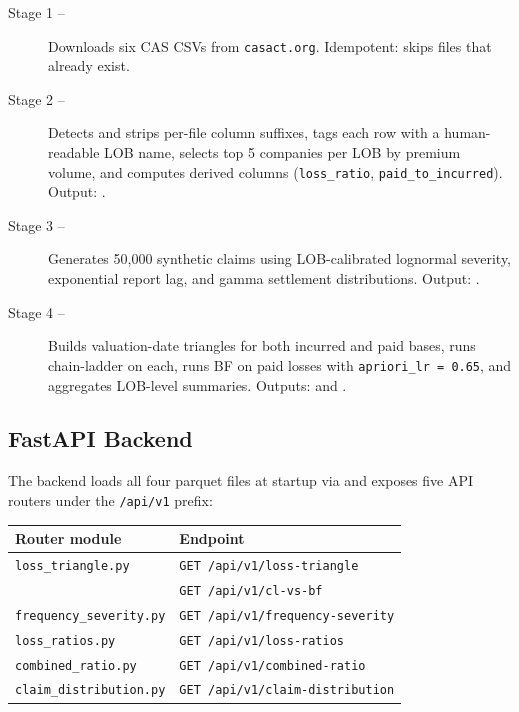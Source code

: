 \begin{description}
  \item[Stage 1 -- ]
    Downloads six CAS CSVs from \texttt{casact.org}.  Idempotent: skips files
    that already exist.

  \item[Stage 2 -- ]
    Detects and strips per-file column suffixes, tags each row with a
    human-readable LOB name, selects top 5 companies per LOB by premium volume,
    and computes derived columns (\texttt{loss\_ratio},
    \texttt{paid\_to\_incurred}).
    Output: .

  \item[Stage 3 -- ]
    Generates 50,000 synthetic claims using LOB-calibrated lognormal severity,
    exponential report lag, and gamma settlement distributions.
    Output: .

  \item[Stage 4 -- ]
    Builds valuation-date triangles for both incurred and paid bases, runs
    chain-ladder on each, runs BF on paid losses with \texttt{apriori\_lr = 0.65},
    and aggregates LOB-level summaries.
    Outputs:  and
    .
\end{description}

\subsection{FastAPI Backend}

The backend loads all four parquet files at startup via
 and exposes five API
routers under the \texttt{/api/v1} prefix:

\begin{center}
\begin{tabular}{ll}
\toprule
\textbf{Router module} & \textbf{Endpoint} \\
\midrule
\texttt{loss\_triangle.py}        & \texttt{GET /api/v1/loss-triangle} \\
                                  & \texttt{GET /api/v1/cl-vs-bf} \\
\texttt{frequency\_severity.py}   & \texttt{GET /api/v1/frequency-severity} \\
\texttt{loss\_ratios.py}          & \texttt{GET /api/v1/loss-ratios} \\
\texttt{combined\_ratio.py}       & \texttt{GET /api/v1/combined-ratio} \\
\texttt{claim\_distribution.py}   & \texttt{GET /api/v1/claim-distribution} \\
\bottomrule
\end{tabular}
\end{center}

